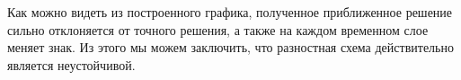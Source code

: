 \documentclass[a4paper, 12pt]{article}
\begin{document}
    \begin{center}
    \end{center}
    { \hspace*{\fill} \\}
    
    \begin{center}
    \end{center}
    { \hspace*{\fill} \\}
    
    \begin{center}
    \end{center}
    { \hspace*{\fill} \\}
    
    \begin{center}
    \end{center}
    { \hspace*{\fill} \\}
    
    \begin{center}
    \end{center}
    { \hspace*{\fill} \\}
    
    Как можно видеть из построенного графика, полученное приближенное
решение сильно отклоняется от точного решения, а также на каждом
временном слое меняет знак. Из этого мы можем заключить, что разностная
схема действительно является неустойчивой.    
    
\end{document}
